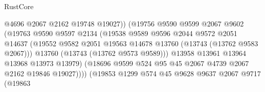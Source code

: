 \begin{lexlean}{RustCore}
\begin{coremodule}
                                        @4696
                                        @2067
                                        @2162
                                        @19748
                                        @19027))
                                    (@19756
                                      @9590
                                      @9599
                                      @2067
                                      @9602
                                      (@19763
                                        @9590
                                        @9597
                                        @2134
                                        (@19538
                                          @9589
                                          @9596
                                          @2044
                                          @9572
                                          @2051
                                          @14637
                                          (@19552
                                            @9582
                                            @2051
                                            @19563
                                            @14678
                                            @13760
                                            (@13743 (@13762 @9583 @2067)))
                                          @13760
                                          (@13743 (@13762 @9573 @9589)))
                                        @13958
                                        @13961
                                        @13964
                                        @13968
                                        @13973
                                        @13979)
                                      (@18696
                                        @9599
                                        @524
                                        @95
                                        @45
                                        @2067
                                        @4739
                                        @2067
                                        @2162
                                        @19846
                                        @19027))))
                                (@19853
                                  @1299
                                  @574
                                  @45
                                  @9628
                                  @9637
                                  @2067
                                  @9717
                                  (@19863

\end{coremodule}
\end{lexlean}
